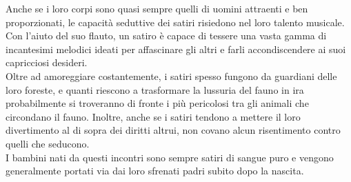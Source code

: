 \begin{multicols}{2}
Anche se i loro corpi sono quasi sempre quelli di uomini attraenti e ben proporzionati, le capacità seduttive dei satiri risiedono nel loro talento musicale. Con l’aiuto del suo flauto, un satiro è capace di tessere una vasta gamma di incantesimi melodici ideati per affascinare gli altri e farli accondiscendere ai suoi capricciosi desideri.\\

Oltre ad amoreggiare costantemente, i satiri spesso fungono da guardiani delle loro foreste, e quanti riescono a trasformare la lussuria del fauno in ira probabilmente si troveranno di fronte i più pericolosi tra gli animali che circondano il fauno. Inoltre, anche se i satiri tendono a mettere il loro divertimento al di sopra dei diritti altrui, non covano alcun risentimento contro quelli che seducono.\\

I bambini nati da questi incontri sono sempre satiri di sangue puro e vengono generalmente portati via dai loro sfrenati padri subito dopo la nascita.\\


\end{multicols}
